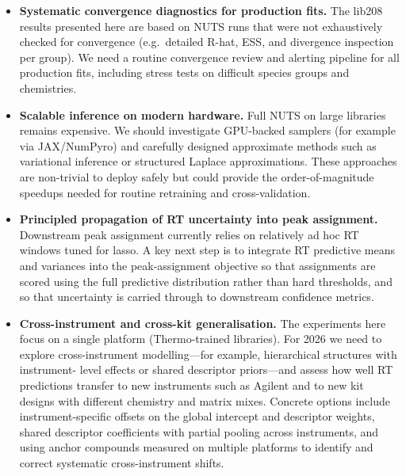 \documentclass[11pt]{article}
\begin{document}
\begin{itemize}
  \item \textbf{Systematic convergence diagnostics for production fits.} The lib208
  results presented here are based on NUTS runs that were not exhaustively checked
  for convergence (e.g.\ detailed R-hat, ESS, and divergence inspection per group).
  We need a routine convergence review and alerting pipeline for all production
  fits, including stress tests on difficult species groups and chemistries.

  \item \textbf{Scalable inference on modern hardware.} Full NUTS on large libraries
  remains expensive. We should investigate GPU-backed samplers (for example via
  JAX/NumPyro) and carefully designed approximate methods such as variational
  inference or structured Laplace approximations. These approaches are non-trivial
  to deploy safely but could provide the order-of-magnitude speedups needed for
  routine retraining and cross-validation.

  \item \textbf{Principled propagation of RT uncertainty into peak assignment.}
  Downstream peak assignment currently relies on relatively ad hoc RT windows tuned
  for lasso. A key next step is to integrate RT predictive means and variances into
  the peak-assignment objective so that assignments are scored using the full
  predictive distribution rather than hard thresholds, and so that uncertainty is
  carried through to downstream confidence metrics.

  \item \textbf{Cross-instrument and cross-kit generalisation.} The experiments here
  focus on a single platform (Thermo-trained libraries). For 2026 we need to explore
  cross-instrument modelling---for example, hierarchical structures with instrument-
  level effects or shared descriptor priors---and assess how well RT predictions
  transfer to new instruments such as Agilent and to new kit designs with different
  chemistry and matrix mixes. Concrete options include instrument-specific offsets
  on the global intercept and descriptor weights, shared descriptor coefficients with
  partial pooling across instruments, and using anchor compounds measured on multiple
  platforms to identify and correct systematic cross-instrument shifts.


\end{itemize}
\end{document}

